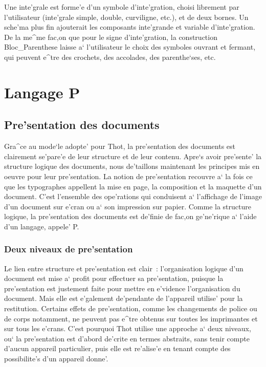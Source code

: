 {Une inte'grale est forme'e d'un symbole d'inte'gration, choisi librement par
l'utilisateur (inte'grale simple, double, curviligne, etc.), et de deux bornes.
Un sche'ma plus fin ajouterait les composants inte'grande et variable
d'inte'gration. De la me^me fac,on que pour le signe d'inte'gration, la
construction Bloc\_Parenthese laisse a` l'utilisateur le choix des
symboles ouvrant et fermant, qui peuvent e^tre des crochets, des accolades,
des parenthe`ses, etc.


\chapter{Langage P}

\section{Pre'sentation des documents}

Gra^ce au mode`le adopte' pour Thot, la pre'sentation des documents est
clairement se'pare'e de leur structure et de leur contenu. Apre`s avoir
pre'sente' la structure logique des documents, nous de'taillons maintenant
les principes mis en oeuvre pour leur pre'sentation. La notion de
pre'sentation recouvre a` la fois ce que les typographes appellent la mise
en page, la composition et la maquette d'un document. C'est l'ensemble des
ope'rations qui conduisent a` l'affichage de l'image d'un document sur e'cran
ou a` son impression sur papier. Comme la structure logique, la pre'sentation
des documents est de'finie de fac,on ge'ne'rique a` l'aide d'un langage,
appele' P.

\subsection{Deux niveaux de pre'sentation}

Le lien entre structure et pre'sentation est clair~: l'organisation logique
d'un document est mise a` profit pour effectuer sa pre'sentation, puisque
la pre'sentation est justement faite pour mettre en e'vidence
l'organisation du document. Mais elle est e'galement de'pendante de l'appareil
utilise' pour la restitution. Certains effets de pre'sentation, comme
les changements de police ou de corps notamment, ne peuvent pas e^tre
obtenus sur toutes les imprimantes et sur tous les e'crans.
C'est pourquoi Thot utilise une approche a` deux niveaux, ou` la pre'sentation
est d'abord de'crite en termes abstraits, sans tenir compte d'aucun appareil
particulier, puis elle est re'alise'e en tenant compte des possibilite's d'un
appareil donne'.

}
